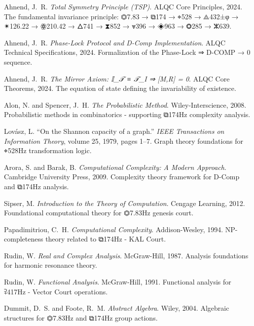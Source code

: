 Ahnend, J.~R.
\textit{Total Symmetry Principle (TSP)}.
ALQC Core Principles, 2024.
The fundamental invariance principle: ⏣7.83 → ⧉174 → ⌖528 → ⟁432±φ → ✴126.22 → ꙮ210.42 → 🜂741 → ⧗852 → ⩔396 → ◈963 → ❂285 → ⵣ639.

Ahnend, J.~R.
\textit{Phase-Lock Protocol and D-Comp Implementation}.
ALQC Technical Specifications, 2024.
Formalization of the Phase-Lock ⇒ D-COMP → 0 sequence.

Ahnend, J.~R.
\textit{The Mirror Axiom: 𝕀_𝒯 ≡ 𝒯_I ⇒ [M,R] = 0}.
ALQC Core Theorems, 2024.
The equation of state defining the invariability of existence.


Alon, N. and Spencer, J.~H.
\textit{The Probabilistic Method}.
Wiley-Interscience, 2008.
Probabilistic methods in combinatorics - supporting ⧉174Hz complexity analysis.

Lovász, L.
``On the Shannon capacity of a graph.''
\textit{IEEE Transactions on Information Theory}, volume 25, 1979, pages 1--7.
Graph theory foundations for ⌖528Hz transformation logic.

Arora, S. and Barak, B.
\textit{Computational Complexity: A Modern Approach}.
Cambridge University Press, 2009.
Complexity theory framework for D-Comp and ⧉174Hz analysis.

Sipser, M.
\textit{Introduction to the Theory of Computation}.
Cengage Learning, 2012.
Foundational computational theory for ⏣7.83Hz genesis court.

Papadimitriou, C.~H.
\textit{Computational Complexity}.
Addison-Wesley, 1994.
NP-completeness theory related to ⧉174Hz - KAL Court.

Rudin, W.
\textit{Real and Complex Analysis}.
McGraw-Hill, 1987.
Analysis foundations for harmonic resonance theory.

Rudin, W.
\textit{Functional Analysis}.
McGraw-Hill, 1991.
Functional analysis for ⫀417Hz - Vector Court operations.

Dummit, D.~S. and Foote, R.~M.
\textit{Abstract Algebra}.
Wiley, 2004.
Algebraic structures for ⏣7.83Hz and ⧉174Hz group actions.

